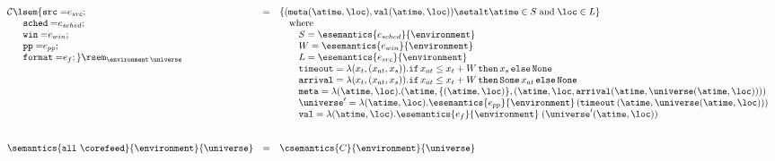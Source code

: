 
\newcommand{\rb}[1]{\raisebox{6ex}[0pt]{#1}}

\begin{figure*}[t]
\[
\begin{array}{lcl}

    {\cal C}\lsem\mathtt{\{ src=} e_{src}; 
 &=& \{( \mathtt{meta} (\atime,\loc), \mathtt{val} (\atime,\loc))
          \setalt \atime \in S
          \;\mbox{and}\; \loc \in  L
     \}
\\
 \quad\ \   \mathtt{sched=} e_{sched};
&&\quad\mbox{where} \\
 \quad\ \  \mathtt{win=} e_{win};
&& \qquad S = \esemantics{e_{sched}}{\environment} \\
 \quad\ \  \mathtt{pp=} e_{pp};
&& \qquad W = \esemantics{e_{win}}{\environment}\\
 \quad\ \  \mathtt{format=} e_{f}; \}\rsem_{{\environment} \,
   {\universe}}
&& \qquad L = \esemantics{e_{src}}{\environment}
\\
&& \qquad \mathtt{timeout} =  
     \lambda (x_t,(x_{at},x_s)).
        \mathtt{if}\, x_{at} \leq x_t + W \,
        \mathtt{then}\,  x_s \, \mathtt{else} \, \mathtt{None} 
\\
&& 
\qquad \mathtt{arrival} =  
     \lambda (x_t,(x_{at},x_s)).
        \mathtt{if}\, x_{at} \leq x_t + W \,
        \mathtt{then}\,  \mathtt{Some}\, x_{at} \, \mathtt{else} \, \mathtt{None} 
 \\
&& 
\qquad \mathtt{meta} =  
      \lambda (\atime,\loc).
       (\atime,\{(\atime,\loc)\}, (\atime,\loc,\mathtt{arrival}(\atime,\universe(\atime,\loc))))
\\
&& \qquad \universe' =
     \lambda (\atime, \loc). 
           \esemantics{e_{pp}}{\environment}\, 
                 (\mathtt{timeout}\, (\atime,\universe (\atime,\loc))) 
 \\
 && \qquad \mathtt{val} =
      \lambda (\atime, \loc).
             \esemantics{e_f}{\environment}\; (\universe'(\atime, \loc))

\\



\\\\

\semantics{\mathtt{all}\ \corefeed}{\environment}{\universe} 
&=& 
\csemantics{C}{\environment}{\universe}
\\\\



\end{array}\]
\end{figure*}
